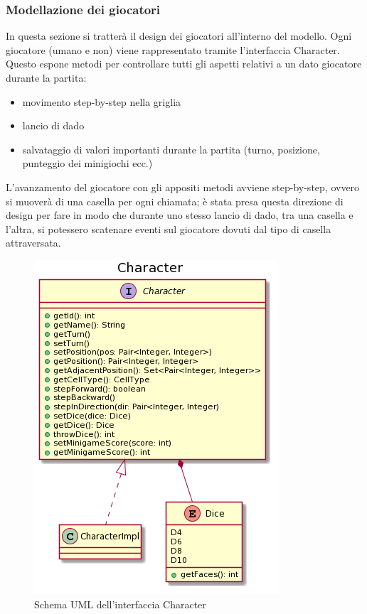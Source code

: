 \documentclass[a4paper,12pt]{report}
\begin{document}
	\subsubsection{Modellazione dei giocatori}
	In questa sezione si tratterà il design dei giocatori all'interno del modello.\newline
	\newline
	Ogni giocatore (umano e non) viene rappresentato tramite l'interfaccia Character.
	Questo espone metodi per controllare tutti gli aspetti relativi a un dato giocatore durante la partita:
	\begin{itemize}
		\item movimento step-by-step nella griglia
	    \item lancio di dado
	    \item salvataggio di valori importanti durante la partita (turno, posizione, punteggio dei minigiochi ecc.)
	\end{itemize}
	L'avanzamento del giocatore con gli appositi metodi avviene step-by-step, ovvero si muoverà di una
	casella per ogni chiamata; è stata presa questa direzione di design per fare in modo che durante
	uno stesso lancio di dado, tra una casella e l'altra, si potessero scatenare eventi sul giocatore
	dovuti dal tipo di casella attraversata.\newline
    \begin{figure}[h]
        \centering{}
        \includegraphics{images/picchiotti/character.png}
        \caption{Schema UML dell'interfaccia Character}
        \label{img:character}
    \end{figure}
\end{document}
